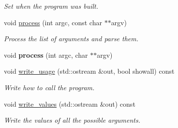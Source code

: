 \begin{DoxyCompactItemize}
\begin{DoxyCompactList}\small\item\em Set when the program was built. \end{DoxyCompactList}\item 
void \hyperlink{classdsr_1_1_argument__helper_a5087edc680d4815831bd4c972f8254fd}{process} (int argc, const char $\ast$$\ast$argv)
\begin{DoxyCompactList}\small\item\em Process the list of arguments and parse them. \end{DoxyCompactList}\item 
\hypertarget{classdsr_1_1_argument__helper_a119295a6bc4fe7d8ab48b810f1df87cf}{
void {\bfseries process} (int argc, char $\ast$$\ast$argv)}
\label{classdsr_1_1_argument__helper_a119295a6bc4fe7d8ab48b810f1df87cf}

\item 
\hypertarget{classdsr_1_1_argument__helper_aea20bf7d3b1f8abfd22fa1aa0d9df627}{
void \hyperlink{classdsr_1_1_argument__helper_aea20bf7d3b1f8abfd22fa1aa0d9df627}{write\_\-usage} (std::ostream \&out, bool showall) const }
\label{classdsr_1_1_argument__helper_aea20bf7d3b1f8abfd22fa1aa0d9df627}

\begin{DoxyCompactList}\small\item\em Write how to call the program. \end{DoxyCompactList}\item 
\hypertarget{classdsr_1_1_argument__helper_a1e4dda73ad0631559d79d8ee1bcb5ddf}{
void \hyperlink{classdsr_1_1_argument__helper_a1e4dda73ad0631559d79d8ee1bcb5ddf}{write\_\-values} (std::ostream \&out) const }
\label{classdsr_1_1_argument__helper_a1e4dda73ad0631559d79d8ee1bcb5ddf}

\begin{DoxyCompactList}\small\item\em Write the values of all the possible arguments. \end{DoxyCompactList}\end{DoxyCompactItemize}
